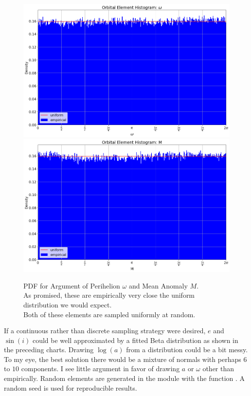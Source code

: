 \begin{figure}[hbt!]
\begin{center}
\includegraphics[width=1.0\textwidth]{../figs/elts/elt_hist_omega_peri.png}
\includegraphics[width=1.0\textwidth]{../figs/elts/elt_hist_M.png}
\end{center}
\caption[PDF for Argument of Perihelion $\omega$ and Mean Anomaly $M$]
{PDF for Argument of Perihelion $\omega$ and Mean Anomaly $M$.\\ 
As promised, these are empirically very close the uniform distribution we would expect.\\
Both of these elements are sampled uniformly at random.}
\end{figure}
\clearpage

If a continuous rather than discrete sampling strategy were desired, $e$ and $\sin(i)$ could be well approximated by 
a fitted Beta distribution as shown in the preceding charts.
Drawing $\log(a)$ from a distribution could be a bit messy.  
To my eye, the best solution there would be a mixture of normals with perhaps $6$ to $10$ components.
I see little argument in favor of drawing $a$ or $\omega$ other than empirically.
Random elements are generated in the module  with the function .
A random seed is used for reproducible results.

